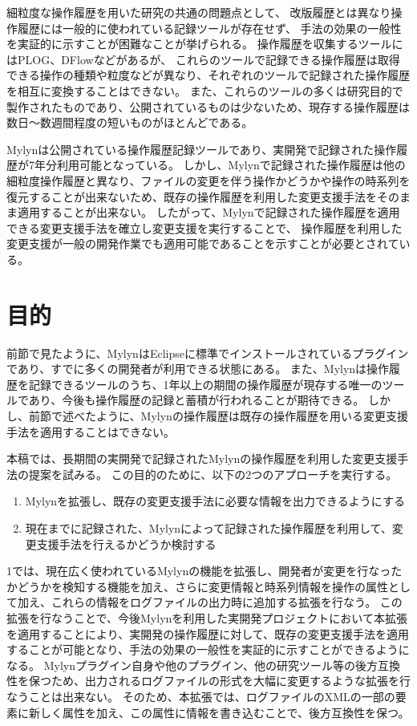 \documentclass[a4paper]{jsbook}
\begin{document}
細粒度な操作履歴を用いた研究の共通の問題点として、
改版履歴とは異なり操作履歴には一般的に使われている記録ツールが存在せず、
手法の効果の一般性を実証的に示すことが困難なことが挙げられる。
操作履歴を収集するツールにはPLOG\cite{plog}、{\sc DFlow}\cite{minelli:2014}などがあるが、
これらのツールで記録できる操作履歴は取得できる操作の種類や粒度などが異なり、それぞれのツールで記録された操作履歴を相互に変換することはできない。
また、これらのツールの多くは研究目的で製作されたものであり、公開されているものは少ないため、現存する操作履歴は数日〜数週間程度の短いものがほとんどである。

Mylyn\cite{Kersten:2005}は公開されている操作履歴記録ツールであり、実開発で記録された操作履歴が7年分利用可能となっている。
しかし、Mylynで記録された操作履歴は他の細粒度操作履歴と異なり、ファイルの変更を伴う操作かどうかや操作の時系列を復元することが出来ないため、既存の操作履歴を利用した変更支援手法をそのまま適用することが出来ない。
したがって、Mylynで記録された操作履歴を適用できる変更支援手法を確立し変更支援を実行することで、
操作履歴を利用した変更支援が一般の開発作業でも適用可能であることを示すことが必要とされている。
\section{目的}
前節で見たように、MylynはEclipseに標準でインストールされているプラグインであり、すでに多くの開発者が利用できる状態にある。
また、Mylynは操作履歴を記録できるツールのうち、1年以上の期間の操作履歴が現存する唯一のツールであり、今後も操作履歴の記録と蓄積が行われることが期待できる。
しかし、前節で述べたように、Mylynの操作履歴は既存の操作履歴を用いる変更支援手法を適用することはできない。

本稿では、長期間の実開発で記録されたMylynの操作履歴を利用した変更支援手法の提案を試みる。
この目的のために、以下の2つのアプローチを実行する。
\begin{enumerate}
  \item Mylynを拡張し、既存の変更支援手法に必要な情報を出力できるようにする
  \item 現在までに記録された、Mylynによって記録された操作履歴を利用して、変更支援手法を行えるかどうか検討する
\end{enumerate}

1では、現在広く使われているMylynの機能を拡張し、開発者が変更を行なったかどうかを検知する機能を加え、さらに変更情報と時系列情報を操作の属性として加え、これらの情報をログファイルの出力時に追加する拡張を行なう。
この拡張を行なうことで、今後Mylynを利用した実開発プロジェクトにおいて本拡張を適用することにより、実開発の操作履歴に対して、既存の変更支援手法を適用することが可能となり、手法の効果の一般性を実証的に示すことができるようになる。
Mylynプラグイン自身や他のプラグイン、他の研究ツール等の後方互換性を保つため、出力されるログファイルの形式を大幅に変更するような拡張を行なうことは出来ない。
そのため、本拡張では、ログファイルのXMLの一部の要素に新しく属性を加え、この属性に情報を書き込むことで、後方互換性を保つ。
\end{document}
